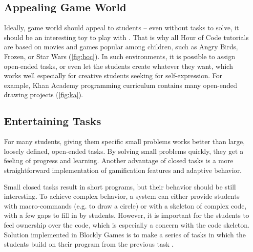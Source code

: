 \subsection{Appealing Game World}
\label{sec:motivation.game-world}
Ideally, game world should appeal to students --
even without tasks to solve,
  it should be an interesting toy to play with \cite{book-of-lenses}.
That is why all Hour of Code tutorials are based on movies and games
  popular among children, such as Angry Birds, Frozen, or Star Wars
  (\cref{fig:hoc}).
In such environments, it is possible to assign open-ended tasks,
  or even let the students create whatever they want,
  which works well especially for creative students seeking for self-expression.
For example, Khan Academy programming curriculum contains many
open-ended drawing projects (\cref{fig:ka}).

\subsection{Entertaining Tasks}
\label{sec:motivation.tasks}
For many students, giving them specific small problems works better
  than large, loosely defined, open-ended tasks.
By solving small problems quickly,
  they get a feeling of progress and learning.
Another advantage of closed tasks
  is a more straightforward implementation of gamification features and adaptive behavior.

Small closed tasks result in short programs,
  but their behavior should be still interesting. %
To achieve complex behavior,
  a system can either provide students with macro-commands (e.g. to draw a circle)
  or with a skeleton of complex code, with a few gaps to fill in by students.
However, it is important for the students to feel ownership over the code,
  which is especially a concern with the code skeleton.
Solution implemented in Blockly Games
  is to make a series of tasks in which the students
  build on their program from the previous task
  \cite{blockly-10-things}.



